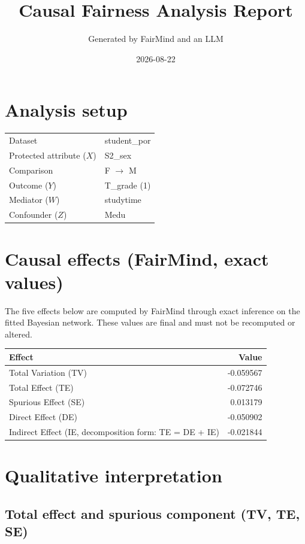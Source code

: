 \documentclass[11pt]{article}
\title{Causal Fairness Analysis Report}
\author{Generated by FairMind and an LLM}
\date{2026-08-22}
\begin{document}
\maketitle

\section{Analysis setup}

\begin{tabular}{ll}
\toprule
Dataset & student\_por \\
Protected attribute ($X$) & S2\_sex \\
Comparison & F $\to$ M \\
Outcome ($Y$) & T\_grade (1) \\
Mediator ($W$) & studytime \\
Confounder ($Z$) & Medu \\
\bottomrule
\end{tabular}

\section{Causal effects (FairMind, exact values)}

The five effects below are computed by FairMind through exact inference on the
fitted Bayesian network. These values are final and must not be recomputed or
altered.

\begin{tabular}{lr}
\toprule
Effect & Value \\
\midrule
Total Variation (TV) & -0.059567 \\
Total Effect (TE) & -0.072746 \\
Spurious Effect (SE) & 0.013179 \\
Direct Effect (DE) & -0.050902 \\
Indirect Effect (IE, decomposition form: TE = DE + IE) & -0.021844 \\
\bottomrule
\end{tabular}

\section{Qualitative interpretation}

\subsection{Total effect and spurious component (TV, TE, SE)}
\end{document}
